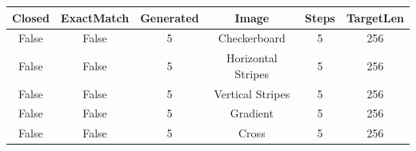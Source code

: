 \begin{table}[h]
\centering
\begin{tabular}{ |c|c|c|c|c|c| }
\hline
Closed & ExactMatch & Generated & Image & Steps & TargetLen \\
\hline
False & False & 5 & Checkerboard & 5 & 256 \\
\hline
False & False & 5 & Horizontal Stripes & 5 & 256 \\
\hline
False & False & 5 & Vertical Stripes & 5 & 256 \\
\hline
False & False & 5 & Gradient & 5 & 256 \\
\hline
False & False & 5 & Cross & 5 & 256 \\
\hline
\end{tabular}
\end{table}
